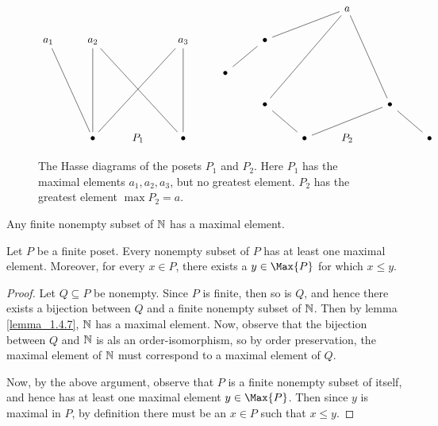 \begin{figure}[h]
  \centering
  \[\begin{tikzcd}
    &&&&&&& a \\
    {a_1} & {a_2} && {a_3} && \bullet \\
    &&&& \bullet \\
    &&&&& \bullet &&& \bullet \\
    & \bullet & {P_1} & \bullet &&& \bullet & {P_2} && \bullet
    \arrow[no head, from=1-8, to=2-6]
    \arrow[no head, from=1-8, to=4-6]
    \arrow[no head, from=1-8, to=4-9]
    \arrow[no head, from=2-2, to=5-2]
    \arrow[no head, from=2-4, to=5-4]
    \arrow[no head, from=2-6, to=3-5]
    \arrow[no head, from=4-9, to=5-10]
    \arrow[no head, from=5-2, to=2-1]
    \arrow[no head, from=5-2, to=2-4]
    \arrow[no head, from=5-4, to=2-2]
    \arrow[no head, from=5-7, to=4-6]
    \arrow[no head, from=5-7, to=4-9]
  \end{tikzcd}\]
  \caption{The Hasse diagrams of the posets $P_1$ and $P_2$. Here
    $P_1$ has the maximal elements $a_1, a_2, a_3$, but no greatest
  element. $P_2$ has the greatest element $\max{P_2}=a$.}
  \label{figure_1.4}
\end{figure}

\begin{lemma}\label{lemma_1.4.7}
  Any finite nonempty subset of $\mathbb{N}$ has a maximal element.
\end{lemma}

\begin{proposition}\label{proposition_1.4.8}
  Let $P$ be a finite poset. Every nonempty subset of $P$ has at least
  one maximal element. Moreover, for every $x \in P$, there exists a
  $y \in \Max{P}$ for which $x \leq y$.
\end{proposition}
\begin{proof}
  Let $Q \subseteq P$ be nonempty. Since $P$ is finite, then so is
  $Q$, and hence there exists a bijection  between $Q$ and a finite
  nonempty subset of $\mathbb{N}$. Then by lemma \ref{lemma_1.4.7}, $\mathbb{N}$ has a
  maximal element. Now, observe that the bijection between $Q$ and
  $\mathbb{N}$ is als an order-isomorphism, so by order preservation, the
  maximal element of $\mathbb{N}$ must correspond to a maximal element of $Q$.

  Now, by the above argument, observe that $P$ is a finite nonempty
  subset of itself, and hence has at least one maximal element $y \in
  \Max{P}$. Then since $y$ is maximal in $P$, by definition there must
  be an $x \in P$ such that $x \leq y$.
\end{proof}

